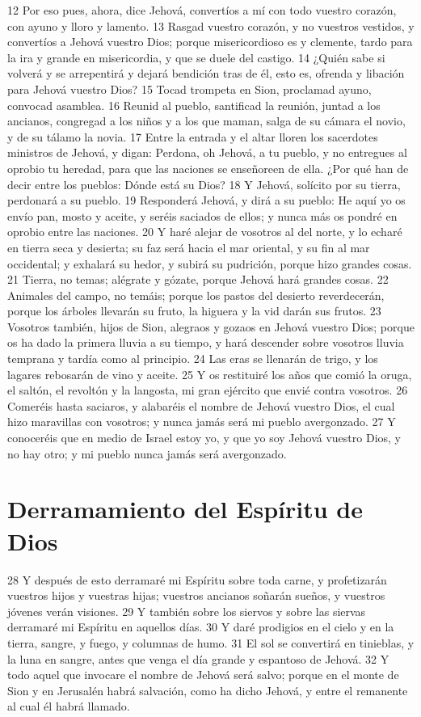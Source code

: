 12 Por eso pues, ahora, dice Jehová, convertíos a mí con todo vuestro corazón, con ayuno y lloro y lamento.
13 Rasgad vuestro corazón, y no vuestros vestidos, y convertíos a Jehová vuestro Dios; porque misericordioso es y clemente, tardo para la ira y grande en misericordia, y que se duele del castigo.
14 ¿Quién sabe si volverá y se arrepentirá y dejará bendición tras de él, esto es, ofrenda y libación para Jehová vuestro Dios?
15 Tocad trompeta en Sion, proclamad ayuno, convocad asamblea.
16 Reunid al pueblo, santificad la reunión, juntad a los ancianos, congregad a los niños y a los que maman, salga de su cámara el novio, y de su tálamo la novia.
17 Entre la entrada y el altar lloren los sacerdotes ministros de Jehová, y digan: Perdona, oh Jehová, a tu pueblo, y no entregues al oprobio tu heredad, para que las naciones se enseñoreen de ella. ¿Por qué han de decir entre los pueblos: Dónde está su Dios?
18 Y Jehová, solícito por su tierra, perdonará a su pueblo.
19 Responderá Jehová, y dirá a su pueblo: He aquí yo os envío pan, mosto y aceite, y seréis saciados de ellos; y nunca más os pondré en oprobio entre las naciones.
20 Y haré alejar de vosotros al del norte, y lo echaré en tierra seca y desierta; su faz será hacia el mar oriental, y su fin al mar occidental; y exhalará su hedor, y subirá su pudrición, porque hizo grandes cosas.
21 Tierra, no temas; alégrate y gózate, porque Jehová hará grandes cosas.
22 Animales del campo, no temáis; porque los pastos del desierto reverdecerán, porque los árboles llevarán su fruto, la higuera y la vid darán sus frutos.
23 Vosotros también, hijos de Sion, alegraos y gozaos en Jehová vuestro Dios; porque os ha dado la primera lluvia a su tiempo, y hará descender sobre vosotros lluvia temprana y tardía como al principio.
24 Las eras se llenarán de trigo, y los lagares rebosarán de vino y aceite.
25 Y os restituiré los años que comió la oruga, el saltón, el revoltón y la langosta, mi gran ejército que envié contra vosotros.
26 Comeréis hasta saciaros, y alabaréis el nombre de Jehová vuestro Dios, el cual hizo maravillas con vosotros; y nunca jamás será mi pueblo avergonzado.
27 Y conoceréis que en medio de Israel estoy yo, y que yo soy Jehová vuestro Dios, y no hay otro; y mi pueblo nunca jamás será avergonzado.

\section*{Derramamiento del Espíritu de Dios}

28 Y después de esto derramaré mi Espíritu sobre toda carne, y profetizarán vuestros hijos y vuestras hijas; vuestros ancianos soñarán sueños, y vuestros jóvenes verán visiones.
29 Y también sobre los siervos y sobre las siervas derramaré mi Espíritu en aquellos días.
30 Y daré prodigios en el cielo y en la tierra, sangre, y fuego, y columnas de humo.
31 El sol se convertirá en tinieblas, y la luna en sangre, antes que venga el día grande y espantoso de Jehová.
32 Y todo aquel que invocare el nombre de Jehová será salvo; porque en el monte de Sion y en Jerusalén habrá salvación, como ha dicho Jehová, y entre el remanente al cual él habrá llamado. 

